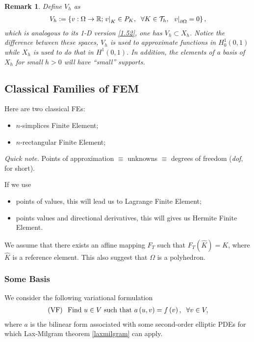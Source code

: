\documentclass[11pt,a4paper,center,notitlepage]{article}
\numberwithin{equation}{section}
\newtheorem{remark}{Remark}[section]
\begin{document}
\begin{remark}
Define $V_h$ as
\begin{align}
{V_h}: = \left\{ {v:\Omega  \to \mathbb{R};{{\left. v \right|}_K} \in {P_K},\hspace{2mm} \forall K \in {\mathcal{T}_h},\hspace{2mm} {{\left. v \right|}_{\partial \Omega }} = 0} \right\},
\end{align}
which is analogous to its 1-D version \eqref{1.52}, one has $V_h \subset X_h$. Notice the difference between these spaces, $V_h$ is used to approximate functions in $H_0^1 \left(0,1\right)$ while $X_h$ is used to do that in $H^1\left(0,1\right)$. In addition, the elements of a basis of $X_h$ for small $h>0$ will have ``small'' supports.
\end{remark}

\subsection{Classical Families of FEM}
Here are two classical FEs:
\begin{itemize}
\item $n$-simplices Finite Element;
\item $n$-rectangular Finite Element;
\end{itemize}
\textit{Quick note.} Points of approximation $\equiv$ unknowns $\equiv$ degrees of freedom (\textit{dof}, for short).

If we use
\begin{itemize}
\item points of values, this will lead us to Lagrange Finite Element;
\item points values and directional derivatives, this will gives us Hermite Finite Element.
\end{itemize}
We assume that there exists an affine mapping $F_T$ such that $F_T\left(\widehat{K}\right) =K$, where $\widehat{K}$ is a reference element. This also suggest that $\Omega$ is a polyhedron.

\subsubsection{Some Basis}
We consider the following variational formulation 
\begin{align}
\left( {\rm VF}\right) \hspace{2mm} \mbox{Find }u \in V \mbox{ such that } a\left( {u,v} \right) = f\left( v \right), \hspace{2mm} \forall v \in V,
\end{align}
where $a$ is the bilinear form associated with some second-order elliptic PDEs for which Lax-Milgram theorem \ref{laxmilgram} can apply.
\end{document}
